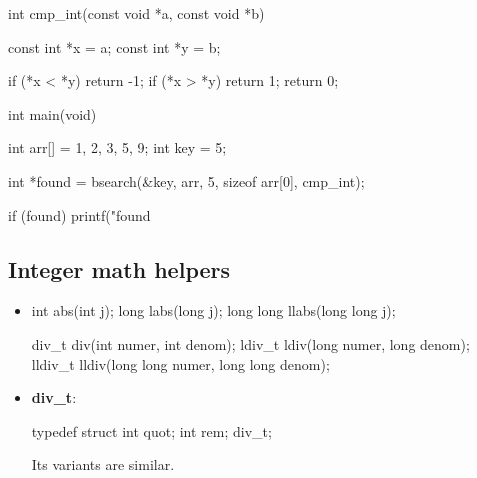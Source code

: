 \documentclass{report}
\begin{document}
\begin{itemize}
\begin{cppcode}
                int cmp_int(const void *a, const void *b) {
                    const int *x = a;
                    const int *y = b;

                    if (*x < *y) return -1;
                    if (*x > *y) return 1;
                    return 0;
                }

                int main(void) {
                    int arr[] = {1, 2, 3, 5, 9};
                    int key = 5;

                    int *found = bsearch(&key, arr, 5, sizeof arr[0], cmp_int);

                    if (found) {
                        printf("found %
                    }
                }
            \end{cppcode}



    \end{itemize}

    \pagebreak 
    \subsection{Integer math helpers}
    \begin{itemize}
        \item 
            \begin{cppcode}
                int abs(int j);        
                long labs(long j);
                long long llabs(long long j);

                div_t div(int numer, int denom);
                ldiv_t ldiv(long numer, long denom);
                lldiv_t lldiv(long long numer, long long denom);
            \end{cppcode}
        \item \textbf{div\_t}: 
            \bigbreak \noindent 
            \begin{cppcode}
                typedef struct {
                    int quot;
                    int rem;
                } div_t;
            \end{cppcode}
            \bigbreak \noindent 
            Its variants are similar.

    \end{itemize}
\end{document}
